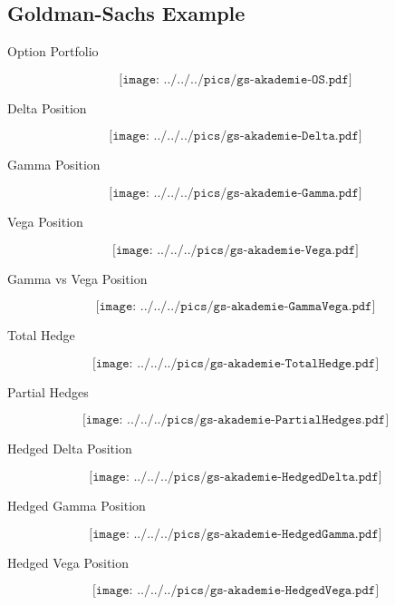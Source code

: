 \subsection{Goldman-Sachs Example}


{Option Portfolio}

$$\texttt{[image: ../../../pics/gs-akademie-OS.pdf]}$$



{Delta Position}

$$\texttt{[image: ../../../pics/gs-akademie-Delta.pdf]}$$



{Gamma Position}

$$\texttt{[image: ../../../pics/gs-akademie-Gamma.pdf]}$$



{Vega Position}

$$\texttt{[image: ../../../pics/gs-akademie-Vega.pdf]}$$



{Gamma vs Vega Position}

$$\texttt{[image: ../../../pics/gs-akademie-GammaVega.pdf]}$$



{Total Hedge}

$$\texttt{[image: ../../../pics/gs-akademie-TotalHedge.pdf]}$$



{Partial Hedges}

$$\texttt{[image: ../../../pics/gs-akademie-PartialHedges.pdf]}$$




{Hedged Delta Position}

$$\texttt{[image: ../../../pics/gs-akademie-HedgedDelta.pdf]}$$


{Hedged Gamma Position}

$$\texttt{[image: ../../../pics/gs-akademie-HedgedGamma.pdf]}$$


{Hedged Vega Position}

$$\texttt{[image: ../../../pics/gs-akademie-HedgedVega.pdf]}$$


